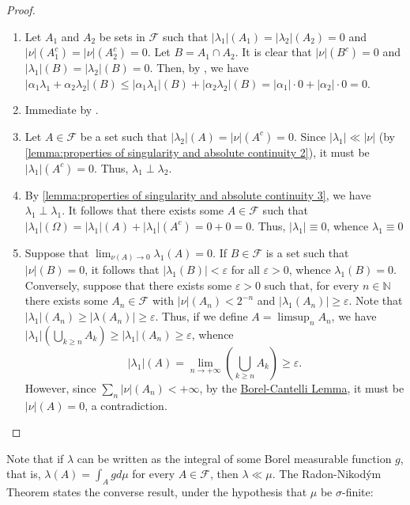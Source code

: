 \begin{proof}
  \begin{enumerate}
	\item Let \(A_{1}\) and \(A_{2}\) be sets in \(\mathcal{F}\) such that
	\(|\lambda_{1}|(A_{1})=|\lambda_{2}|(A_{2})=0\) and \(|\nu|(A_{1}^{c})=|\nu|(A_{2}^{c})=0\).
		  Let \(B=A_{1}\cap A_{2}\). It is clear that \(|\nu|(B^{c})=0\) and \(|\lambda_{1}|(B)=|\lambda_{2}|(B)=0\).
		  Then, by , we have \(|\alpha_{1}\lambda_{1}+\alpha_{2}\lambda_{2}|(B)\leq|\alpha_{1}\lambda_{1}|(B)+|\alpha_{2}\lambda_{2}|(B)=|\alpha_{1}|\cdot0+|\alpha_{2}|\cdot0=0\).
	\item Immediate by .
	\item Let \(A\in\mathcal{F}\) be a set such that \(|\lambda_{2}|(A)=|\nu|(A^{c})=0\). Since \(|\lambda_{1}|\ll|\nu|\) (by \ref{lemma:properties of singularity and absolute continuity 2}), it must be \(|\lambda_{1}|(A^{c})=0\). Thus, \(\lambda_{1}\perp\lambda_{2}\).
	\item By \ref{lemma:properties of singularity and absolute continuity 3}, we have \(\lambda_{1}\perp\lambda_{1}\). It follows that there exists some \(A\in\mathcal{F}\) such that  \(|\lambda_{1}|(\Omega)=|\lambda_{1}|(A)+|\lambda_{1}|(A^{c})=0+0=0\). Thus, \(|\lambda_{1}|\equiv0\), whence \(\lambda_{1}\equiv0\)
	\item Suppose that \(\lim_{\nu(A)\to0}\lambda_{1}(A)=0\). If \(B\in\mathcal{F}\) is a set such that \(|\nu|(B)=0\), it follows that \(|\lambda_{1}(B)|<\varepsilon\) for all \(\varepsilon>0\), whence \(\lambda_{1}(B)=0\).
		  Conversely, suppose that there exists some \(\varepsilon>0\) such that, for every \(n\in\mathbb{N}\) there exists some \(A_{n}\in\mathcal{F}\) with \(|\nu|(A_{n})<2^{-n}\) and
		  \(|\lambda_{1}(A_{n})|\geq\varepsilon\). Note that \(|\lambda_{1}|(A_{n})\geq|\lambda(A_{n})|\geq\varepsilon\). Thus, if we define \(A=\limsup_{n}A_{n}\), we have \(|\lambda_{1}|(\bigcup_{k\geq
		  n}A_{k})\geq|\lambda_{1}|(A_{n})\geq\varepsilon\), whence
		  \[|\lambda_{1}|(A)=\lim_{n\to+\infty}\left(\bigcup_{k\geq n}A_{k}\right)\geq\varepsilon.\]
			However, since \(\sum_{n}|\nu|(A_{n})<+\infty\), by the \hyperref[theorem:Borel-Cantelli Lemma]{Borel-Cantelli Lemma}, it must be \(|\nu|(A)=0\), a contradiction.
  \end{enumerate}
\end{proof}

Note that if \(\lambda\) can be written as the integral of some Borel measurable
function \(g\), that is, \(\lambda(A)=\int_{A}gd\mu\) for every \(A\in\mathcal{F}\), then
\(\lambda\ll\mu\). The Radon-Nikodým Theorem states the converse result, under
the hypothesis that \(\mu\) be \(\sigma\)-finite:

